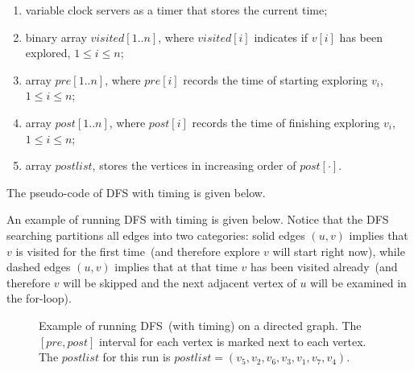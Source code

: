 \vspace*{-\topsep}
\begin{enumerate}
\item variable clock servers as a timer that stores the current time;
\item binary array $visited[1..n]$, where $visited[i]$ indicates if $v[i]$ has been explored, $1 \le i \le n$;
\item array $pre[1..n]$, where $pre[i]$ records the time of starting exploring $v_i$, $1 \le i \le n$;
\item array $post[1..n]$, where $post[i]$ records the time of finishing exploring $v_i$, $1 \le i \le n$;
\item array $postlist$, stores the vertices in increasing order of $post[\cdot]$.
\end{enumerate}

The pseudo-code of DFS with timing is given below.

\begin{minipage}{0.8\textwidth}
	\xxx
	\xxx
	\xxx
	\xxx
	\xxx
	\xxx
\end{minipage}

\begin{minipage}{0.8\textwidth}
	\xxx
	\xxx
	\xxx
	\xxx
	\xxx
	\xxx
	\xxx
	\xxx
	\xxx
	\xxx
	\xxx
\end{minipage}

An example of running DFS with timing is given below.
Notice that the DFS searching partitions all edges into two categories:
solid edges $(u,v)$ implies that $v$ is visited for the first time~(and therefore explore $v$ will start right now),
while dashed edges $(u,v)$ implies that at that time $v$ has been visited already~(and therefore $v$ will be skipped and the next adjacent
vertex of $u$ will be examined in the for-loop). 

\begin{figure}[h!]
\centering{}
\caption{Example of running DFS~(with timing) on a directed graph. 
The $[pre,post]$ interval for each vertex
is marked next to each vertex. The $postlist$ for this run is $postlist = (v_5,v_2,v_6,v_3,v_1,v_7,v_4)$.}
\end{figure}
